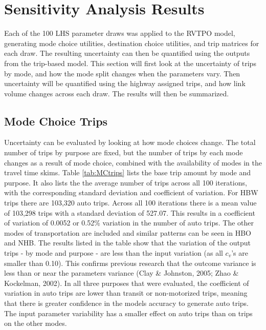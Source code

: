 \documentclass[fancy, masters]{byuthesis}
\begin{document}
\hypertarget{sensitivity-analysis-results}{%
\chapter{Sensitivity Analysis Results}\label{sensitivity-analysis-results}}

Each of the 100 LHS parameter draws was applied to the RVTPO model, generating mode choice utilities, destination choice utilities, and trip matrices for each draw. The resulting uncertainty can then be quantified using the outputs from the trip-based model. This section will first look at the uncertainty of trips by mode, and how the mode split changes when the parameters vary. Then uncertainty will be quantified using the highway assigned trips, and how link volume changes across each draw. The results will then be summarized.

\hypertarget{mode-choice-trips}{%
\section{Mode Choice Trips}\label{mode-choice-trips}}

Uncertainty can be evaluated by looking at how mode choices change. The total number of trips by purpose are fixed, but the number of trips by each mode changes as a result of mode choice, combined with the availability of modes in the travel time skims. Table \ref{tab:MCtrips} lists the base trip amount by mode and purpose. It also lists the the average number of trips across all 100 iterations, with the corresponding standard deviation and coefficient of variation. For HBW trips there are 103,320 auto trips. Across all 100 iterations there is a mean value of 103,298 trips with a standard deviation of 527.07. This results in a coefficient of variation of 0.0052 or 0.52\% variation in the number of auto trips. The other modes of transportation are included and similar patterns can be seen in HBO and NHB. The results listed in the table show that the variation of the output trips - by mode and purpose - are less than the input variation (as all \(c_v\)'s are smaller than 0.10). This confirms previous research that the outcome variance is less than or near the parameters variance (Clay \& Johnston, 2005; Zhao \& Kockelman, 2002). In all three purposes that were evaluated, the coefficient of variation in auto trips are lower than transit or non-motorized trips, meaning that there is greater confidence in the models accuracy to generate auto trips. The input parameter variability has a smaller effect on auto trips than on trips on the other modes.
\end{document}
